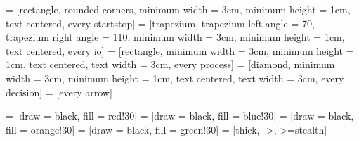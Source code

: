 



\newcolumntype{!}{>{\global\let\currentrowstyle\relax}}
\newcolumntype{^}{>{\currentrowstyle}}
\newcommand{\rowstyle}[1]{\gdef\currentrowstyle{#1}%
	#1\ignorespaces%
}


\newcommand{\nodeDistance}{2.0cm}
\newcommand{\nextto}{0.5cm}



 = [rectangle, rounded corners, minimum width = 3cm, minimum height = 1cm, text centered, every startstop]
 = [trapezium, trapezium left angle = 70, trapezium right angle = 110, minimum width = 3cm, minimum height = 1cm, text centered, every io]
 = [rectangle, minimum width = 3cm, minimum height = 1cm, text centered, text width = 3cm, every process]
 = [diamond, minimum width = 3cm, minimum height = 1cm, text centered, text width = 3cm, every decision]
  = [every arrow]

  = [draw = black, fill = red!30]
  = [draw = black, fill = blue!30]
  = [draw = black, fill = orange!30]
  = [draw = black, fill = green!30]
  = [thick, ->, >=stealth]

